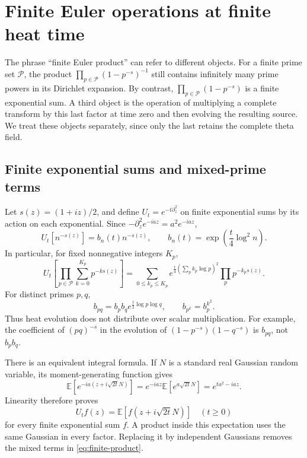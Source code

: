 \section{Finite Euler operations at finite heat time}\label{sec:packets}

The phrase ``finite Euler product'' can refer to different objects. For a
finite prime set $\mathcal P$, the product
$\prod_{p\in\mathcal P}(1-p^{-s})^{-1}$ still contains infinitely many
prime powers in its Dirichlet expansion. By contrast,
$\prod_{p\in\mathcal P}(1-p^{-s})$ is a finite exponential sum. A third
object is the operation of multiplying a complete transform by this last
factor at time zero and then evolving the resulting source. We treat these
objects separately, since only the last retains the complete theta field.

\subsection{Finite exponential sums and mixed-prime terms}

Let $s(z)=(1+iz)/2$, and define $U_t=e^{-t\partial_z^2}$ on finite
exponential sums by its action on each exponential. Since
$-\partial_z^2 e^{-iaz}=a^2e^{-iaz}$,
\begin{equation}\label{eq:heat-weight}
 U_t[n^{-s(z)}]=b_n(t)n^{-s(z)},\qquad
 b_n(t)=\exp\left(\frac t4\log^2n\right).
\end{equation}
In particular, for fixed nonnegative integers $K_p$,
\begin{equation}\label{eq:finite-product}
 U_t\left[\prod_{p\in\mathcal P}\sum_{k=0}^{K_p}p^{-ks(z)}\right]
 =\sum_{0\le k_p\le K_p}
 e^{\frac t4(\sum_p k_p\log p)^2}\prod_p p^{-k_ps(z)}.
\end{equation}
For distinct primes $p,q$,
\[
 b_{pq}=b_pb_q e^{\frac t2\log p\log q},\qquad
 b_{p^k}=b_p^{k^2}.
\]
Thus heat evolution does not distribute over scalar multiplication. For
example, the coefficient of $(pq)^{-s}$ in the evolution of
$(1-p^{-s})(1-q^{-s})$ is $b_{pq}$, not $b_pb_q$.

There is an equivalent integral formula. If $N$ is a standard real Gaussian
random variable, its moment-generating function gives
\[
 \mathbb E[e^{-ia(z+i\sqrt{2t}N)}]
 =e^{-iaz}\mathbb E[e^{a\sqrt{2t}N}]
 =e^{ta^2-iaz}.
\]
Linearity therefore proves
\begin{equation}\label{eq:gaussian}
 U_tf(z)=\mathbb E[f(z+i\sqrt{2t}N)]\quad(t\ge0)
\end{equation}
for every finite exponential sum $f$. A product inside this expectation
uses the same Gaussian in every factor. Replacing it by independent
Gaussians removes the mixed terms in \eqref{eq:finite-product}.

